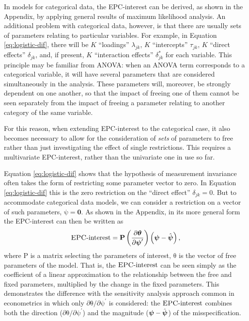 \documentclass[letterpaper,12pt]{article}
\newcommand\vm[1]{%
\bm{\mathrm{#1}}}
\newcommand{\param}{\vm{\theta}}
\newcommand{\bpsi}{\vm{\psi}}
\newcommand{\da}{\textrm{{\sc {EPC}}-interest}}
\begin{document}
In models for categorical data, the EPC-interest can be derived, as shown in the Appendix, by applying general results of maximum likelihood analysis. An additional problem with categorical data, however, is that there are usually sets of parameters relating to particular variables. For example, in Equation \ref{eq:logistic-dif}, there will be $K$ ``loadings'' $\lambda_{jk}$, $K$ ``intercepts'' $\tau_{jk}$,  $K$ ``direct effects'' $\delta_{jk}$, and, if present, $K$ ``interaction effects'' $\delta^*_{jk}$ for each variable. This principle may be familiar from ANOVA: when an ANOVA term corresponds to a categorical variable, it will have several parameters that are considered simultaneously in the analysis. These parameters will, moreover, be strongly dependent on one another, so that the impact of freeing one of them cannot be seen separately from the impact of freeing a parameter relating to another category of the same variable. 

For this reason, when extending EPC-interest to the categorical case, it also becomes necessary to allow for the consideration of \emph{sets} of parameters to free rather than just investigating the effect of single restrictions. This requires a multivariate EPC-interest, rather than the univariate one in use so far. 

Equation \ref{eq:logistic-dif} shows that the hypothesis of measurement invariance often takes the form of restricting some parameter vector to zero. In Equation \ref{eq:logistic-dif} this is the zero restriction on the ``direct effect'' $\delta_{jk}=0$. But to accommodate categorical data models, we can consider a restriction on a vector of such parameters, $\bpsi=\mathbf{0}$.
As shown in the Appendix, in its more general form the EPC-interest can then be written as 
\begin{equation}
	\da = \vm{P} \left( \frac{\partial \param} {\partial \bpsi^\prime} \right) \left( \bpsi - \hat{\bpsi}\right),
	\label{eq:epc-linear}
\end{equation}
where $\vm{P}$ is a matrix selecting the parameters of interest, $\param$ is the vector of free parameters of the model.
That is, the $\da{}$ can be seen simply as the coefficient of a linear approximation to the relationship between the free and fixed parameters, multiplied by the change in the fixed parameters. This demonstrates the difference with the sensitivity analysis approach common in econometrics \citep[p. 168]{magnus2007local} in which only $\partial \param / \partial \bpsi^\prime$ is considered: the $\da{}$ combines both the direction ($\partial \param / \partial \bpsi^\prime$) and the magnitude ($ \bpsi - \hat{\bpsi}$) of the misspecification.
\end{document}
